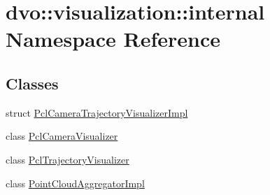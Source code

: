 \hypertarget{namespacedvo_1_1visualization_1_1internal}{}\section{dvo\+:\+:visualization\+:\+:internal Namespace Reference}
\label{namespacedvo_1_1visualization_1_1internal}
\subsection*{Classes}
\begin{DoxyCompactItemize}
\item 
struct \mbox{\hyperlink{structdvo_1_1visualization_1_1internal_1_1_pcl_camera_trajectory_visualizer_impl}{Pcl\+Camera\+Trajectory\+Visualizer\+Impl}}
\item 
class \mbox{\hyperlink{classdvo_1_1visualization_1_1internal_1_1_pcl_camera_visualizer}{Pcl\+Camera\+Visualizer}}
\item 
class \mbox{\hyperlink{classdvo_1_1visualization_1_1internal_1_1_pcl_trajectory_visualizer}{Pcl\+Trajectory\+Visualizer}}
\item 
class \mbox{\hyperlink{classdvo_1_1visualization_1_1internal_1_1_point_cloud_aggregator_impl}{Point\+Cloud\+Aggregator\+Impl}}
\end{DoxyCompactItemize}
